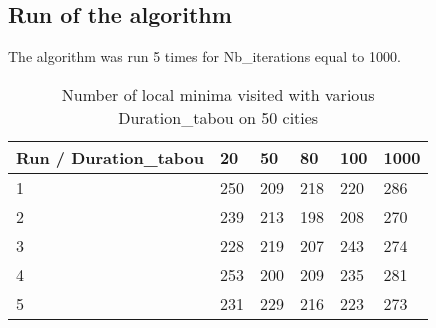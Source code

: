 \documentclass[12pt,oneside,a4paper]{article}
\begin{document}
\subsection{Run of the algorithm}
  The algorithm was run 5 times for Nb\_iterations equal to 1000.
\begin{table}[h]
    \centering
    \small
    \begin{tabular}{llllll}
      \hline
      \multicolumn{1}{|l|}{\textbf{Run / Duration\_tabou}}& \multicolumn{1}{l|}{\textbf{20}} & \multicolumn{1}{l|}{\textbf{50}} & \multicolumn{1}{l|}{\textbf{80}} & \multicolumn{1}{l|}{\textbf{100}} & \multicolumn{1}{l|}{\textbf{1000}}\\ \hline
      \multicolumn{1}{|l|}{1} & \multicolumn{1}{l|}{250}  & \multicolumn{1}{l|}{209}  & \multicolumn{1}{l|}{218}   & \multicolumn{1}{l|}{220}  & \multicolumn{1}{l|}{286} \\ \hline
      \multicolumn{1}{|l|}{2} & \multicolumn{1}{l|}{239}  & \multicolumn{1}{l|}{213}  & \multicolumn{1}{l|}{198}  & \multicolumn{1}{l|}{208}  & \multicolumn{1}{l|}{270} \\ \hline         
      \multicolumn{1}{|l|}{3} & \multicolumn{1}{l|}{228}  & \multicolumn{1}{l|}{219}  & \multicolumn{1}{l|}{207}  & \multicolumn{1}{l|}{243}  & \multicolumn{1}{l|}{274} \\ \hline
      \multicolumn{1}{|l|}{4} & \multicolumn{1}{l|}{253}  & \multicolumn{1}{l|}{200}  & \multicolumn{1}{l|}{209}   & \multicolumn{1}{l|}{235}  & \multicolumn{1}{l|}{281}\\ \hline
      \multicolumn{1}{|l|}{5} & \multicolumn{1}{l|}{231}  & \multicolumn{1}{l|}{229}  & \multicolumn{1}{l|}{216}   & \multicolumn{1}{l|}{223}  & \multicolumn{1}{l|}{273}\\ \hline
    \end{tabular}
    \caption{Number of local minima visited with various Duration\_tabou on 50 cities}
  \end{table}
\end{document}
